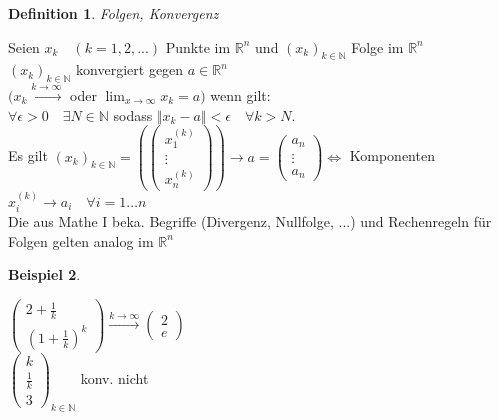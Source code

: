 \documentclass[a4paper,11pt]{article}
\newtheorem{definition}{Definition}[section]
\newtheorem{bsp}[definition]{Beispiel}
\begin{document}
\begin{definition}
	Folgen, Konvergenz
\end{definition}
Seien $x_k\quad (k=1,2,...)$ Punkte im $\mathbb{R}^n$ und $(x_k)_{k\in\mathbb{N}}$ Folge im $\mathbb{R}^n$ \\
$(x_k)_{k\in\mathbb{N}}$ konvergiert gegen $a\in\mathbb{R}^n$ \\
$(x_k\overset{k\rightarrow\infty}{\longrightarrow}$ oder $\lim_{x\rightarrow\infty} x_k=a)$ wenn gilt: \\
$\forall\epsilon>0\quad\exists N\in\mathbb{N}$ sodass $\Vert x_k-a\Vert<\epsilon\quad\forall k> N.$ \\
Es gilt $(x_k)_{k\in\mathbb{N}}=\left(\begin{pmatrix}x_1^{(k)}\\\vdots\\ x_n^{(k)}\end{pmatrix}\right)\longrightarrow a=\begin{pmatrix}a_n\\\vdots\\ a_n\end{pmatrix} \Leftrightarrow$ Komponenten $x_i^{(k)}\longrightarrow a_i\quad\forall i=1\hdots n$ \\
Die aus Mathe I beka. Begriffe (Divergenz, Nullfolge, ...) und Rechenregeln für Folgen gelten analog im $\mathbb{R}^n$

\begin{bsp}
\end{bsp}
$\begin{pmatrix}2+\frac{1}{k}\\ (1+\frac{1}{k})^k\end{pmatrix}\overset{k\rightarrow\infty}{\longrightarrow}\begin{pmatrix}2\\e\end{pmatrix}$ \\
$\begin{pmatrix}k\\\frac{1}{k}\\3\end{pmatrix}_{k\in\mathbb{N}}$ konv. nicht

\newpage
\end{document}
